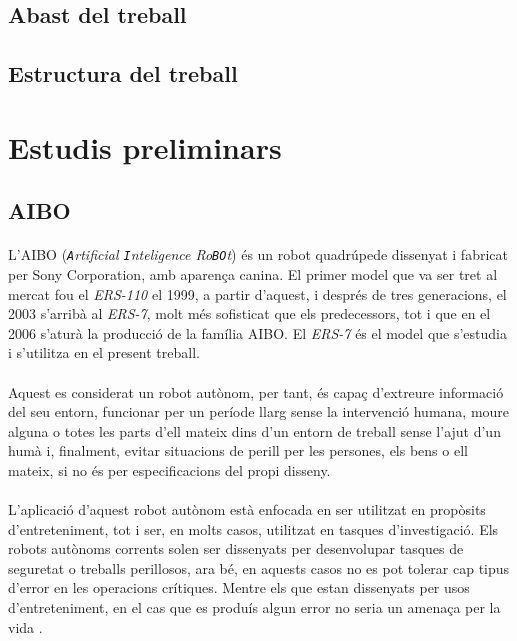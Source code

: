 \documentclass[12pt,a4paper,final,twoside]{article}
\begin{document}
\subsection*{Abast del treball}


\subsection*{Estructura del treball}

\newpage


\section{Estudis preliminars}
\subsection{AIBO}
\paragraph{}L'AIBO (\textit{\texttt{A}rtificial \texttt{I}nteligence Ro\texttt{BO}t}) és un robot quadrúpede dissenyat i fabricat per Sony Corporation, amb aparença canina. El primer model que va ser tret al mercat fou el \textit{ERS-110} el 1999, a partir d'aquest, i després de tres generacions, el 2003 s'arribà al \textit{ERS-7}, molt més sofisticat que els predecessors, tot i que en el 2006 s'aturà la producció de la família AIBO. El \textit{ERS-7} és el model que s'estudia i s'utilitza en el present treball.

\paragraph{}Aquest es considerat un robot autònom, per tant, és capaç d'extreure informació del seu entorn, funcionar per un període llarg sense la intervenció humana, moure alguna o totes les parts d'ell mateix dins d'un entorn de treball sense l'ajut d'un humà i, finalment, evitar situacions de perill per les persones, els bens o ell mateix, si no és per especificacions del propi disseny.

\paragraph{}L'aplicació d'aquest robot autònom està enfocada en ser utilitzat en propòsits d'entreteniment, tot i ser, en molts casos, utilitzat en tasques d'investigació. Els robots autònoms corrents solen ser dissenyats per desenvolupar tasques de seguretat o treballs perillosos, ara bé, en aquests casos no es pot tolerar cap tipus d'error en les operacions crítiques. Mentre els que estan dissenyats per usos d'entreteniment, en el cas que es produís algun error no seria un amenaça per la vida \cite{Fujita2000}.
\end{document}
